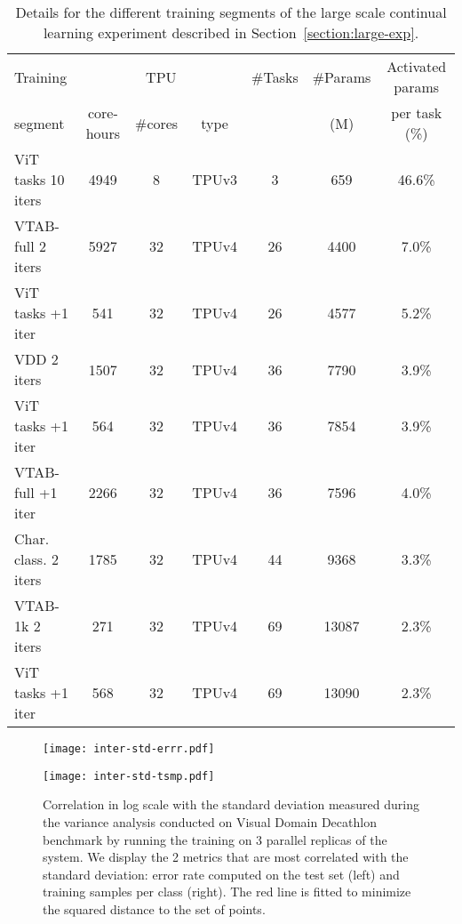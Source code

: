 \documentclass{article} \usepackage{iclr2023_conference,times}
\begin{document}
\vspace{40pt}
\begin{table}[h]
\caption{
Details for the different training segments of the large scale continual learning experiment described in Section~\ref{section:large-exp}.
}
\label{table:compute}
\centering
\begin{tabular}{lcccccc}
\toprule
Training & \multicolumn{3}{c}{TPU}  & \#Tasks & \#Params & Activated params  \\
  \cmidrule(r){2-4}
segment & core-hours & \#cores & type & & (M) & per task (\%) \\
\midrule
 ViT tasks 10 iters &  4949 &  8 & TPUv3 &  3 &  659 &  46.6\% \\
 VTAB-full 2 iters &  5927 &  32 & TPUv4 &  26 &  4400 & 7.0\% \\
 ViT tasks +1 iter &  541 &  32 & TPUv4 &  26 &  4577 & 5.2\% \\
 VDD 2 iters &  1507 &  32 & TPUv4 &  36 &  7790 & 3.9\% \\
 ViT tasks +1 iter &  564 &  32 & TPUv4 &  36 &  7854 & 3.9\%  \\
 VTAB-full +1 iter &  2266 &  32 & TPUv4 &  36 &  7596 & 4.0\% \\
 Char. class. 2 iters &  1785 &  32 & TPUv4 &  44 &  9368 & 3.3\% \\
 VTAB-1k 2 iters &  271 &  32 & TPUv4 &  69 &  13087 & 2.3\%  \\
 ViT tasks +1 iter &  568 &  32 & TPUv4 &  69 &  13090 & 2.3\%  \\
\bottomrule
\end{tabular}
\end{table}

\clearpage
\begin{figure}[t]
\centering
\begin{minipage}{.5\textwidth}
  \centering
  \texttt{[image: inter-std-errr.pdf]}
\end{minipage}\begin{minipage}{.5\textwidth}
  \centering
  \texttt{[image: inter-std-tsmp.pdf]}

\end{minipage}
\caption{Correlation in log scale with the standard deviation measured during the variance analysis conducted on Visual Domain Decathlon benchmark by running the training on 3 parallel replicas of the system.
We display the 2 metrics that are most correlated with the standard deviation: error rate computed on the test set (left) and training samples per class (right).
The red line is fitted to minimize the squared distance to the set of points.}
\label{fig:std-corr}
\end{figure}
\end{document}
